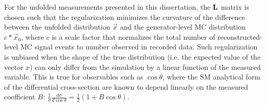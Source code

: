 For the unfolded measurements presented in this dissertation, the $\mathbf{L}$ matrix is chosen such that the regularization minimizes the curvature of the difference between the unfolded distribution $\vec{x}$ and the generator-level MC distribution $c*\vec{x}_{0}$, where $c$ is a scale factor that normalizes the total number of reconstructed-level MC signal events to number observed in recorded data.
Such regularization is unbiased when the shape of the true distribution (i.e. the expected value of the vector $x$) can only differ from the simulation by a linear function of the measured variable. This is true for observables such as $\cos\theta$, where the SM analytical form of the differential cross-section are known to depend linearly on the measured coefficient $B$: $\tfrac{1}{\sigma}\tfrac{d\sigma}{d\cos\theta} = \tfrac{1}{2} (1+B \cos\theta)$. 

